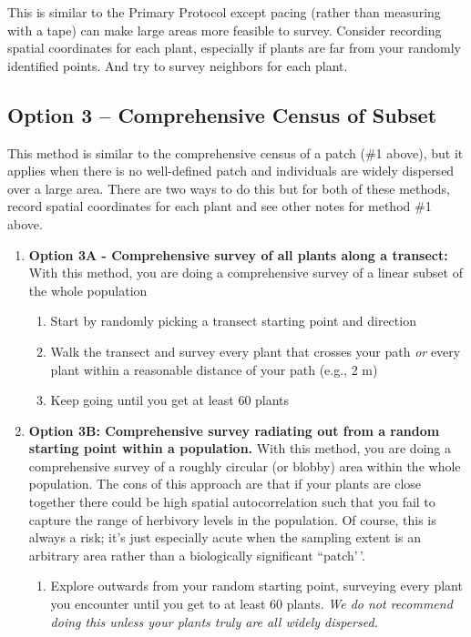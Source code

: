 \documentclass[
  letterpaper,
  DIV=11,
  numbers=noendperiod]{scrreprt}
\providecommand{\tightlist}{%
  \setlength{\itemsep}{0pt}\setlength{\parskip}{0pt}}\usepackage{longtable,booktabs,array}
\begin{document}
This is similar to the Primary Protocol except pacing (rather than
measuring with a tape) can make large areas more feasible to survey.
Consider recording spatial coordinates for each plant, especially if
plants are far from your randomly identified points. And try to survey
neighbors for each plant.

\subsection{Option 3 -- Comprehensive Census of
Subset}\label{option-3-comprehensive-census-of-subset}

This method is similar to the comprehensive census of a patch (\#1
above), but it applies when there is no well-defined patch and
individuals are widely dispersed over a large area. There are two ways
to do this but for both of these methods, record spatial coordinates for
each plant and see other notes for method \#1 above.

\begin{enumerate}
\def\labelenumi{\arabic{enumi}.}
\item
  \textbf{Option 3A - Comprehensive survey of all plants along a
  transect: }With this method, you are doing a comprehensive survey of a
  linear subset of the whole population

  \begin{enumerate}
  \def\labelenumii{\alph{enumii}.}
  \item
    Start by randomly picking a transect starting point and direction
  \item
    Walk the transect and survey every plant that crosses your path
    \emph{or} every plant within a reasonable distance of your path
    (e.g., 2 m)
  \item
    Keep going until you get at least 60 plants
  \end{enumerate}
\item
  \textbf{Option 3B: Comprehensive survey radiating out from a random
  starting point within a population. } With this method, you are doing
  a comprehensive survey of a roughly circular (or blobby) area within
  the whole population. The cons of this approach are that if your
  plants are close together there could be high spatial autocorrelation
  such that you fail to capture the range of herbivory levels in the
  population. Of course, this is always a risk; it's just especially
  acute when the sampling extent is an arbitrary area rather than a
  biologically significant ``patch'\,'.

  \begin{enumerate}
  \def\labelenumii{\alph{enumii}.}
  \tightlist
  \item
    Explore outwards from your random starting point, surveying every
    plant you encounter until you get to at least 60 plants. \emph{We do
    not recommend doing this unless your plants truly are all widely
    dispersed.}
  \end{enumerate}
\end{enumerate}
\end{document}
